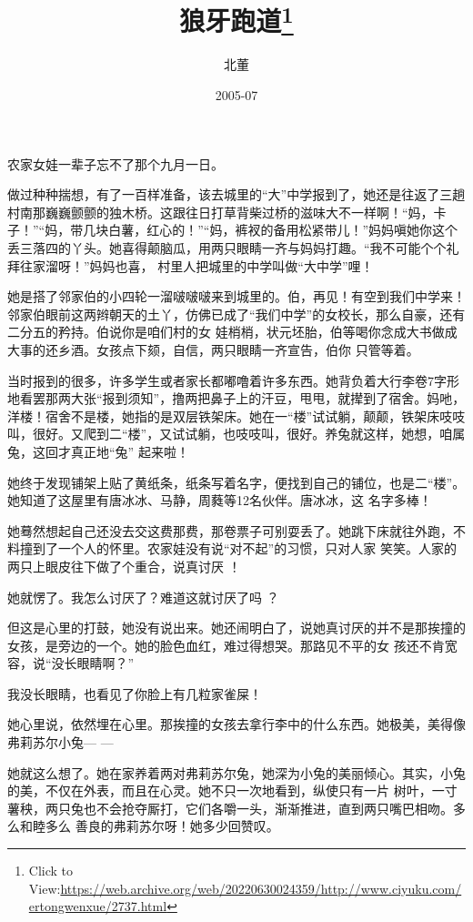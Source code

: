 \documentclass{article}
\title{狼牙跑道\footnote{Click to View:\url{https://web.archive.org/web/20220630024359/http://www.ciyuku.com/ertongwenxue/2737.html}}}
\author{北董}
\date{2005-07}
\begin{document}

\maketitle


\Large


﻿农家女娃一辈子忘不了那个九月一日。 

做过种种揣想，有了一百样准备，该去城里的“大”中学报到了，她还是往返了三趟村南那巍巍颤颤的独木桥。这跟往日打草背柴过桥的滋味大不一样啊！“妈，卡子！”“妈，带几块白薯，红心的！”“妈，裤衩的备用松紧带儿！”妈妈嗔她你这个丢三落四的丫头。她喜得颠脑瓜，用两只眼睛一齐与妈妈打趣。“我不可能个个礼拜往家溜呀！”妈妈也喜，
村里人把城里的中学叫做“大中学”哩！ 

她是搭了邻家伯的小四轮一溜啵啵啵来到城里的。伯，再见！有空到我们中学来！邻家伯眼前这两辫朝天的土丫，仿佛已成了“我们中学”的女校长，那么自豪，还有二分五的矜持。伯说你是咱们村的女
\newpage
娃梢梢，状元坯胎，伯等喝你念成大书做成大事的还乡酒。女孩点下颏，自信，两只眼睛一齐宣告，伯你
只管等着。 

当时报到的很多，许多学生或者家长都嘟噜着许多东西。她背负着大行李卷7字形地看罢那两大张“报到须知”，撸两把鼻子上的汗豆，甩甩，就撵到了宿舍。妈吔，洋楼！宿舍不是楼，她指的是双层铁架床。她在一“楼”试试躺，颠颠，铁架床吱吱叫，很好。又爬到二“楼”，又试试躺，也吱吱叫，很好。养兔就这样，她想，咱属兔，这回才真正地“兔”
起来啦！ 

她终于发现铺架上贴了黄纸条，纸条写着名字，便找到自己的铺位，也是二“楼”。她知道了这屋里有唐冰冰、马静，周蕤等12名伙伴。唐冰冰，这
名字多棒！ 

她蓦然想起自己还没去交这费那费，那卷票子可别耍丢了。她跳下床就往外跑，不料撞到了一个人的怀里。农家娃没有说“对不起”的习惯，只对人家
\newpage
笑笑。人家的两只上眼皮往下做了个重合，说真讨厌
！ 

她就愣了。我怎么讨厌了？难道这就讨厌了吗
？ 

但这是心里的打鼓，她没有说出来。她还闹明白了，说她真讨厌的并不是那挨撞的女孩，是旁边的一个。她的脸色血红，难过得想哭。那路见不平的女
孩还不肯宽容，说“没长眼睛啊？” 

我没长眼睛，也看见了你脸上有几粒家雀屎！
 

她心里说，依然埋在心里。那挨撞的女孩去拿行李中的什么东西。她极美，美得像弗莉苏尔小兔—
— 

她就这么想了。她在家养着两对弗莉苏尔兔，她深为小兔的美丽倾心。其实，小兔的美，不仅在外表，而且在心灵。她不只一次地看到，纵使只有一片
\newpage
树叶，一寸薯秧，两只兔也不会抢夺厮打，它们各嚼一头，渐渐推进，直到两只嘴巴相吻。多么和睦多么
善良的弗莉苏尔呀！她多少回赞叹。 
\end{document}
